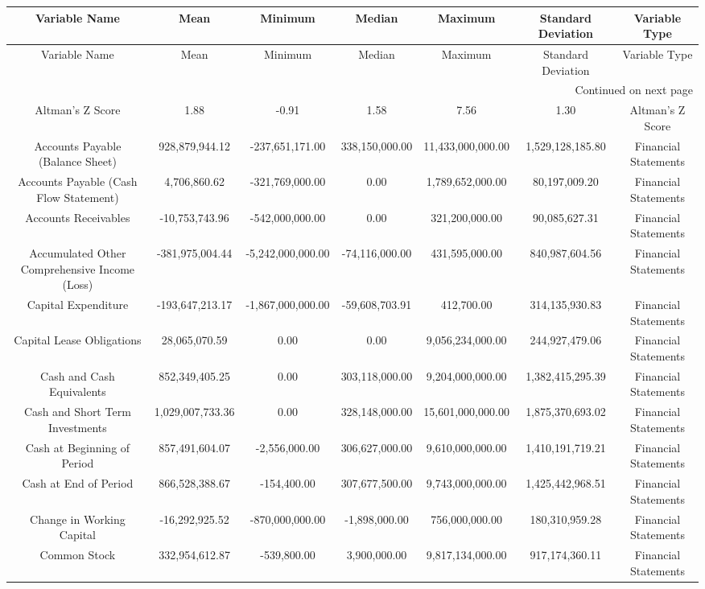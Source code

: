 \begin{longtable}{ccccccc}
\toprule
Variable Name & Mean & Minimum & Median & Maximum & Standard Deviation & Variable Type \\
\midrule
\endfirsthead
\toprule
Variable Name & Mean & Minimum & Median & Maximum & Standard Deviation & Variable Type \\
\midrule
\endhead
\midrule
\multicolumn{7}{r}{Continued on next page} \\
\midrule
\endfoot
\bottomrule
\endlastfoot
Altman's Z Score & 1.88 & -0.91 & 1.58 & 7.56 & 1.30 & Altman's Z Score \\
Accounts Payable (Balance Sheet) & 928,879,944.12 & -237,651,171.00 & 338,150,000.00 & 11,433,000,000.00 & 1,529,128,185.80 & Financial Statements \\
Accounts Payable (Cash Flow Statement) & 4,706,860.62 & -321,769,000.00 & 0.00 & 1,789,652,000.00 & 80,197,009.20 & Financial Statements \\
Accounts Receivables & -10,753,743.96 & -542,000,000.00 & 0.00 & 321,200,000.00 & 90,085,627.31 & Financial Statements \\
Accumulated Other Comprehensive Income (Loss) & -381,975,004.44 & -5,242,000,000.00 & -74,116,000.00 & 431,595,000.00 & 840,987,604.56 & Financial Statements \\
Capital Expenditure & -193,647,213.17 & -1,867,000,000.00 & -59,608,703.91 & 412,700.00 & 314,135,930.83 & Financial Statements \\
Capital Lease Obligations & 28,065,070.59 & 0.00 & 0.00 & 9,056,234,000.00 & 244,927,479.06 & Financial Statements \\
Cash and Cash Equivalents & 852,349,405.25 & 0.00 & 303,118,000.00 & 9,204,000,000.00 & 1,382,415,295.39 & Financial Statements \\
Cash and Short Term Investments & 1,029,007,733.36 & 0.00 & 328,148,000.00 & 15,601,000,000.00 & 1,875,370,693.02 & Financial Statements \\
Cash at Beginning of Period & 857,491,604.07 & -2,556,000.00 & 306,627,000.00 & 9,610,000,000.00 & 1,410,191,719.21 & Financial Statements \\
Cash at End of Period & 866,528,388.67 & -154,400.00 & 307,677,500.00 & 9,743,000,000.00 & 1,425,442,968.51 & Financial Statements \\
Change in Working Capital & -16,292,925.52 & -870,000,000.00 & -1,898,000.00 & 756,000,000.00 & 180,310,959.28 & Financial Statements \\
Common Stock & 332,954,612.87 & -539,800.00 & 3,900,000.00 & 9,817,134,000.00 & 917,174,360.11 & Financial Statements \\

\end{longtable}
